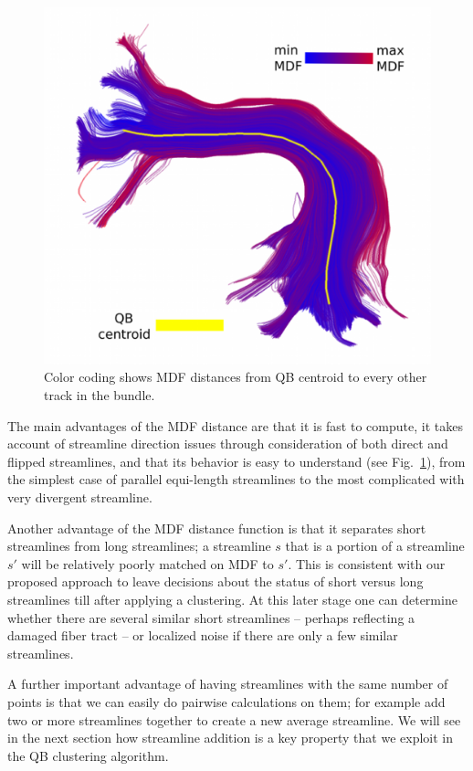 \documentclass{bioinfo}
\begin{document}
\begin{methods}
\begin{figure}
\includegraphics[scale=0.15]{Figures/Fig_11_MDF_arcuate}
\centering{}
\caption{Color coding shows MDF distances from QB centroid to every
  other track in the bundle.\label{Flo:MDF_arcuate}}
\end{figure}


The main advantages of the MDF distance are that it is fast to compute,
it takes account of streamline direction issues through consideration of
both direct and flipped streamlines, and that its behavior is easy to
understand (see Fig.~\ref{Flo:MDF_arcuate}), from the simplest case of
parallel equi-length streamlines to the most complicated with very
divergent streamline.

Another advantage of the MDF distance function is that it separates
short streamlines from long streamlines; a streamline $s$ that is a
portion of a streamline $s'$ will be relatively poorly matched on MDF to
$s'$. This is consistent with our proposed approach to leave decisions
about the status of short versus long streamlines till after applying a
clustering. At this later stage one can determine whether there are
several similar short streamlines -- perhaps reflecting a damaged fiber
tract -- or localized noise if there are only a few similar streamlines.

A further important advantage of having streamlines with the same number
of points is that we can easily do pairwise calculations on them; for
example add two or more streamlines together to create a new average
streamline. We will see in the next section how streamline addition is a
key property that we exploit in the QB clustering algorithm.


\end{methods}
\end{document}
